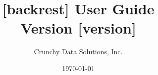 \documentclass[titlepage,letterpaper,12pt]{article}
\begin{document}
\title{{[backrest]} User Guide\\
       Version {[version]}}
\author{Crunchy Data Solutions, Inc.}
\date{\today}
\maketitle

\thispagestyle{plain}
\renewcommand\contentsname{Table of Contents}
\tableofcontents

\end{document}
